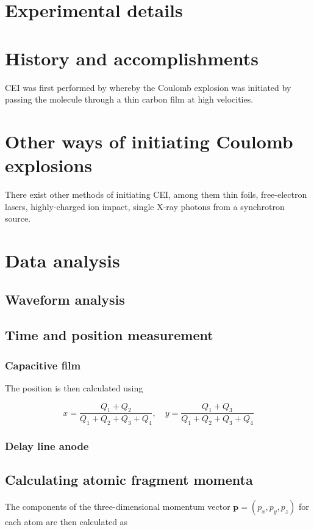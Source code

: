 \section{Experimental details}

\section{History and accomplishments}
CEI was first performed by \citet{Vager89} whereby the Coulomb explosion was initiated by passing the molecule through a thin carbon film at high velocities.

\section{Other ways of initiating Coulomb explosions}
There exist other methods of initiating CEI, among them thin foils, free-electron lasers, highly-charged ion impact, single X-ray photons from a synchrotron source.

\section{Data analysis}
\subsection{Waveform analysis}
\subsection{Time and position measurement}
\subsubsection{Capacitive film}
The position is then calculated using

\begin{equation}
x = \frac{Q_1 + Q_2}{Q_1 + Q_2 + Q_3 + Q_4} ,\quad
y = \frac{Q_1 + Q_3}{Q_1 + Q_2 + Q_3 + Q_4}
\end{equation}

\subsubsection{Delay line anode}
\subsection{Calculating atomic fragment momenta}
The components of the three-dimensional momentum vector $\mathbf{p} = (p_x,p_y,p_z)$ for each atom are then calculated as

